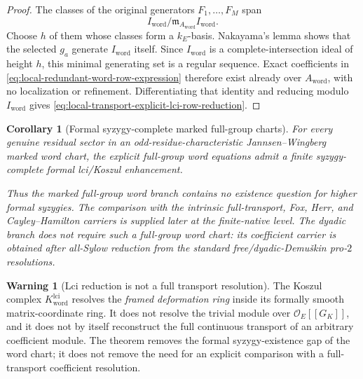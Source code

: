 \documentclass[11pt]{article}
\newtheorem{corollary}[theorem]{Corollary}
\theoremstyle{definition}
\newtheorem{warning}[theorem]{Warning}
\begin{document}
\begin{proof}
The classes of the original generators $F_1,\ldots,F_M$ span
\[
 I_{\mathrm{word}}/
 \mathfrak m_{A_{\mathrm{word}}}I_{\mathrm{word}}.
\]
Choose $h$ of them whose classes form a $k_E$-basis.  Nakayama's lemma
shows that the selected $g_a$ generate $I_{\mathrm{word}}$ itself.  Since
$I_{\mathrm{word}}$ is a complete-intersection ideal of height $h$, this
minimal generating set is a regular sequence.  Exact coefficients in
\eqref{eq:local-redundant-word-row-expression} therefore exist already over
$A_{\mathrm{word}}$, with no localization or refinement.  Differentiating
that identity and reducing modulo $I_{\mathrm{word}}$ gives
\eqref{eq:local-transport-explicit-lci-row-reduction}.
\end{proof}

\begin{corollary}[Formal syzygy-complete marked full-group charts]\label{cor:formal-full-group-syzygy-complete}
For every genuine residual sector in an odd-residue-characteristic
Jannsen--Wingberg marked word chart, the explicit full-group word equations
admit a finite syzygy-complete formal lci/Koszul enhancement.

Thus the marked full-group word branch contains no existence question for
higher formal syzygies.  The comparison with the intrinsic full-transport,
Fox, Herr, and Cayley--Hamilton carriers is supplied later at the finite-native
level.  The dyadic branch does not require such a full-group word chart: its
coefficient carrier is obtained after all-Sylow reduction from the standard
free/dyadic-Demu\v{s}kin pro-$2$ resolutions.
\end{corollary}

\begin{warning}[Lci reduction is not a full transport resolution]\label{warn:lci-word-not-group-resolution}
The Koszul complex $K_{\mathrm{word}}^{\mathrm{lci}}$ resolves the \emph{framed deformation ring} inside its formally smooth matrix-coordinate ring.  It does not resolve the trivial module over $\mathcal O_E[[G_K]]$, and it does not by itself reconstruct the full continuous transport of an arbitrary coefficient module.  The theorem removes the formal syzygy-existence gap of the word chart; it does not remove the need for an explicit comparison with a full-transport coefficient resolution.
\end{warning}
\end{document}
